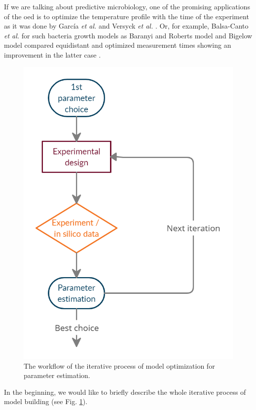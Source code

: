 \documentclass[10pt,A4paper]{article}
\newcommand{\etal}{{\textit{et al. }}}
\begin{document}
If we are talking about predictive microbiology, one of the promising applications of the \ac{oed} is to optimize the temperature profile with the time of the experiment as it was done by García \etal \cite{garciaQualityShelflifePrediction2015} and Versyck \etal \cite{versyckIntroducingOptimal1999}.
Or, for example, Balsa-Canto \etal for such bacteria growth models as Baranyi and Roberts model and Bigelow model compared equidistant and optimized measurement times showing an improvement in the latter case \cite{balsa-cantoe.bangaj.r.COMPUTINGOPTIMALDYNAMIC2008}.
\begin{figure}[H]
    \centering
    \includegraphics[scale=0.25]{Figures/scheme.png}
    \caption{{\footnotesize The workflow of the iterative process of model optimization for parameter estimation.}}
    \label{fig:expdesign_scheme}
\end{figure}
In the beginning, we would like to briefly describe the whole iterative process of model building (see Fig. \ref{fig:expdesign_scheme}).
\end{document}
